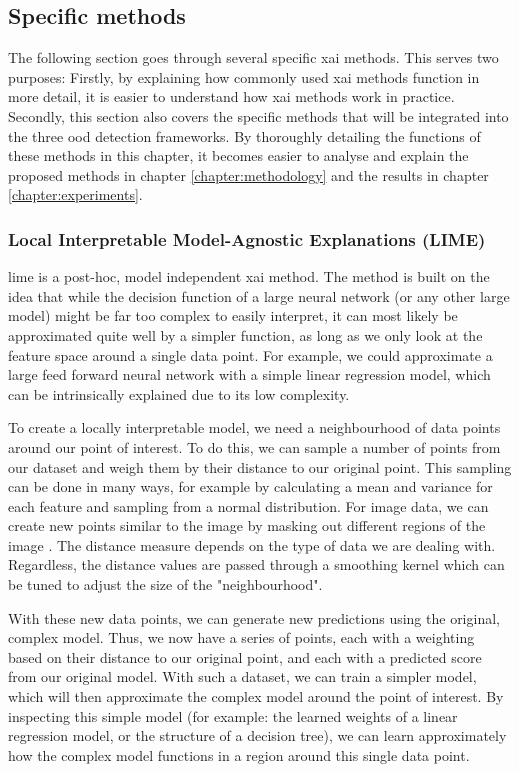 \documentclass[UKenglish]{uiomasterthesis} %
\theoremstyle{definition}
\begin{document}
\subsection{Specific methods} \label{section:xaimethodsbackground}


The following section goes through several specific \ac{xai} methods. This serves two purposes: Firstly, by explaining how commonly used \ac{xai} methods function in more detail, it is easier to understand how \ac{xai} methods work in practice. Secondly, this section also covers the specific methods that will be integrated into the three \ac{ood} detection frameworks. By thoroughly detailing the functions of these methods in this chapter, it becomes easier to analyse and explain the proposed methods in chapter \ref{chapter:methodology} and the results in chapter \ref{chapter:experiments}.
\\


\subsubsection{Local Interpretable Model-Agnostic Explanations (LIME)}

\ac{lime} \cite{lime} is a post-hoc, model independent \ac{xai} method. The method is built on the idea that while the decision function of a large neural network (or any other large model) might be far too complex to easily interpret, it can most likely be approximated quite well by a simpler function, as long as we only look at the feature space around a single data point. For example, we could approximate a large feed forward neural network with a simple linear regression model, which can be intrinsically explained due to its low complexity.

To create a locally interpretable model, we need a neighbourhood of data points around our point of interest. To do this, we can sample a number of points from our dataset and weigh them by their distance to our original point. This sampling can be done in many ways, for example by calculating a mean and variance for each feature and sampling from a normal distribution. For image data, we can create new points similar to the image by masking out different regions of the image \cite{molnar}. The distance measure depends on the type of data we are dealing with. Regardless, the distance values are passed through a smoothing kernel which can be tuned to adjust the size of the "neighbourhood".

With these new data points, we can generate new predictions using the original, complex model. Thus, we now have a series of points, each with a weighting based on their distance to our original point, and each with a predicted score from our original model. With such a dataset, we can train a simpler model, which will then approximate the complex model around the point of interest. By inspecting this simple model (for example: the learned weights of a linear regression model, or the structure of a decision tree), we can learn approximately how the complex model functions in a region around this single data point.
\end{document}
